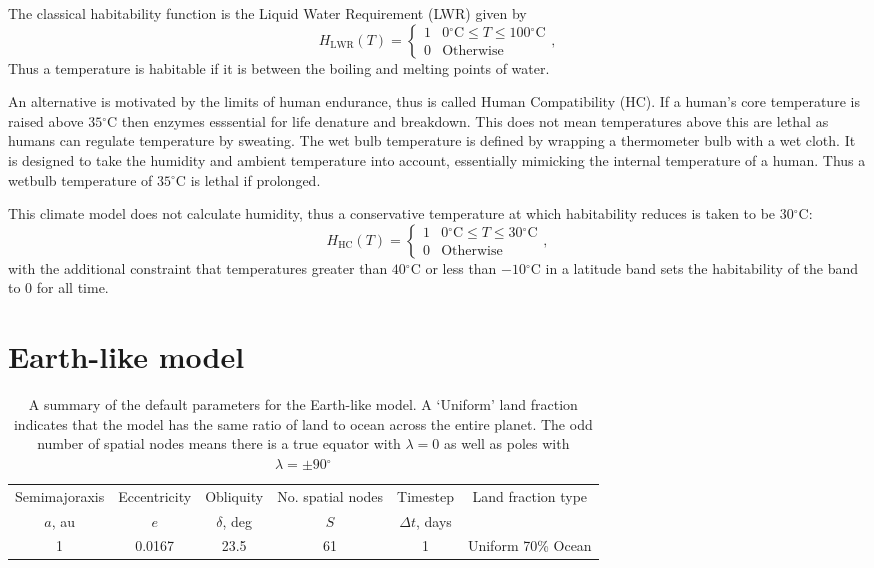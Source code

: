 \documentclass[12pt, onecolumn]{revtex4-2}    %
\newcommand{\degrees}{\ensuremath{^{\circ}}}
\newcommand{\degreesC}{\ensuremath{^{\circ}\text{C}}}
\begin{document}
The classical habitability function is the Liquid Water Requirement (LWR) given by
\begin{equation}
  H_\text{LWR}(T) =
  \begin{cases}
    1 & 0\degreesC \le T \le 100\degreesC \\
    0 & \text{Otherwise}
  \end{cases},
  \label{eq:H_LWR}
\end{equation}
Thus a temperature is habitable if it is between the boiling and melting points of water.

An alternative is motivated by the limits of human endurance, thus is called Human Compatibility (HC).
If a human's core temperature is raised above $35\degreesC$ then enzymes esssential for life denature and breakdown.
This does not mean temperatures above this are lethal as humans can regulate temperature by sweating.
The wet bulb temperature is defined by wrapping a thermometer bulb with a wet cloth.
It is designed to take the humidity and ambient temperature into account, essentially mimicking the internal temperature of a human.
Thus a wetbulb temperature of $35\degreesC$ is lethal if prolonged.

This climate model does not calculate humidity,
thus a conservative temperature at which habitability reduces is taken to be $30\degreesC$:
\begin{equation}
  H_\text{HC}(T) =
  \begin{cases}
    1 & 0\degreesC \le T \le 30\degreesC \\
    0 & \text{Otherwise}
  \end{cases},
  \label{eq:H_HC}
\end{equation}
with the additional constraint that temperatures greater than $40\degreesC$ or less than $-10\degreesC$ in a latitude band sets the habitability of the band to 0 for all time.

\section{Earth-like model} \label{sec:EarthLikeModel}
\begin{table*}
  \begin{tabular}{|c|c|c|c|c|c|}
    \hline
    Semimajoraxis & Eccentricity & Obliquity     & No. spatial nodes & Timestep         & \multirow{2}{*}{Land fraction type} \\
    $a$, au       & $e$          & $\delta$, deg & $S$               & $\Delta t$, days &                                     \\
    \hline
    1             & 0.0167       & 23.5          & 61                & 1                & Uniform 70\% Ocean                  \\
    \hline
  \end{tabular}
  \caption{A summary of the default parameters for the Earth-like model.
    A `Uniform' land fraction indicates that the model has the same ratio of land to ocean across the entire planet.
    The odd number of spatial nodes means there is a true equator with $\lambda = 0$ as well as poles with $\lambda = \pm 90\degrees$}
  \label{tab:default_params}
\end{table*}
\end{document}

